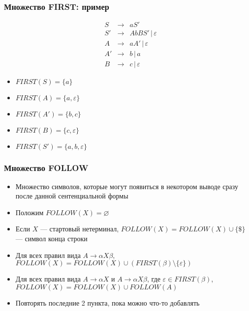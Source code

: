 \documentclass{beamer}
\begin{document}
\begin{frame}[fragile]
  \transwipe[direction=90]
  \frametitle{Множество FIRST: пример}
  $$
  \begin{array}{crcl}
  &S  & \rightarrow & a S' \\
  
  &S' & \rightarrow & A b B S' \, | \, \varepsilon \\
  
  &A  & \rightarrow & a A' \, | \, \varepsilon \\
  &A' & \rightarrow & b \, | \, a \\
  &B  & \rightarrow & c \, | \, \varepsilon  
  \end{array}
  $$ \pause
  
  \begin{itemize}
    \item $FIRST(S) = \{ a \}$ \pause
    \item $FIRST(A) = \{ a, \varepsilon \}$ \pause
    \item $FIRST(A') = \{ b, c \}$ \pause
    \item $FIRST(B) = \{ c, \varepsilon \}$ \pause
    \item $FIRST(S') = \{ a, b, \varepsilon \}$ 
  \end{itemize}
\end{frame}

\begin{frame}[fragile]
  \transwipe[direction=90]
  \frametitle{Множество FOLLOW}
  \begin{itemize}
   \item Множество символов, которые могут появиться в некотором выводе сразу после данной сентенциальной формы
   \item Положим $FOLLOW(X) = \varnothing $
   \item Если $X$ --- стартовый нетерминал, $FOLLOW(X) = FOLLOW(X) \cup \{ \$ \}$ --- символ конца строки
   \item Для всех правил вида $A \rightarrow \alpha X \beta$, $FOLLOW(X) = FOLLOW(X) \cup (FIRST(\beta) \setminus \{ \varepsilon\})$
   \item Для всех правил вида $A \rightarrow \alpha X$ и $A \rightarrow \alpha X \beta$, где $\varepsilon \in FIRST(\beta)$, $FOLLOW(X) = FOLLOW(X) \cup FOLLOW(A)$
   \item Повторять последние 2 пункта, пока можно что-то добавлять
  \end{itemize}
\end{frame}
\end{document}
